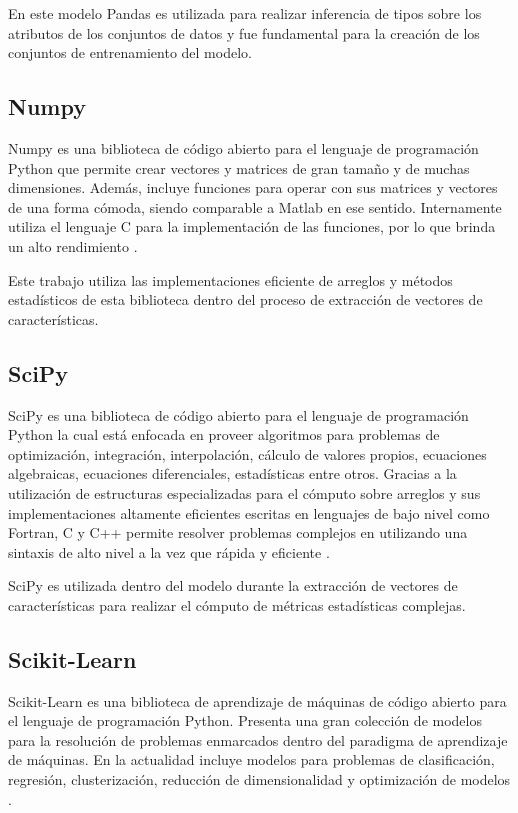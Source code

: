 En este modelo Pandas es utilizada para realizar inferencia de tipos
sobre los atributos de los conjuntos de datos y fue fundamental para
la creaci\'on de los conjuntos de entrenamiento del modelo.

\subsection{Numpy}
Numpy es una biblioteca de c\'odigo abierto para el lenguaje de
programaci\'on Python que permite crear vectores y matrices de gran
tama\~no y de muchas dimensiones. Adem\'as, incluye
funciones para operar con sus matrices y vectores de una forma
c\'omoda, siendo comparable a Matlab en ese sentido. Internamente
utiliza el lenguaje C para la implementaci\'on de las funciones, por
lo que brinda un alto rendimiento \cite{harris2020array}.

Este trabajo utiliza las implementaciones eficiente de arreglos y m\'etodos estad\'isticos
de esta biblioteca dentro del proceso de extracci\'on de vectores de caracter\'isticas.

\subsection{SciPy}
SciPy es una biblioteca de c\'odigo abierto para el lenguaje de
programaci\'on Python la cual est\'a enfocada en proveer algoritmos
para problemas de optimizaci\'on, integraci\'on, interpolaci\'on,
c\'alculo de valores propios, ecuaciones algebraicas, ecuaciones diferenciales,
estad\'isticas entre otros. Gracias a la utilizaci\'on de estructuras
especializadas para el c\'omputo sobre arreglos y sus implementaciones
altamente eficientes escritas en lenguajes de bajo nivel como Fortran, C y C++
permite resolver problemas complejos en utilizando una sintaxis de alto nivel a la
vez que r\'apida y eficiente \cite{2020SciPy-NMeth}.

SciPy es utilizada dentro del modelo durante la extracci\'on de vectores
de caracter\'isticas para realizar el c\'omputo de m\'etricas estad\'isticas complejas.

\subsection{Scikit-Learn}
Scikit-Learn es una biblioteca de aprendizaje de m\'aquinas de c\'odigo abierto para el
lenguaje de programaci\'on Python. Presenta una gran colecci\'on de modelos
para la resoluci\'on de problemas enmarcados dentro del paradigma de aprendizaje de m\'aquinas.
En la actualidad incluye modelos para problemas de clasificaci\'on, regresi\'on, 
clusterizaci\'on, reducci\'on de dimensionalidad y optimizaci\'on de modelos \cite{scikit-learn}.

